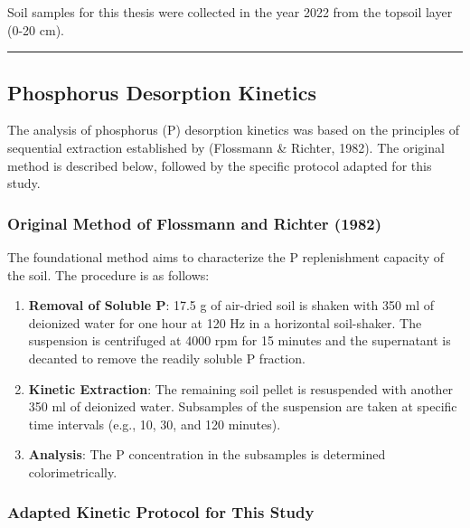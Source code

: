 \documentclass[
  a4paper,
]{article}
\providecommand{\tightlist}{%
  \setlength{\itemsep}{0pt}\setlength{\parskip}{0pt}}
\begin{document}
Soil samples for this thesis were collected in the year 2022 from the
topsoil layer (0-20 cm).

\begin{center}\rule{0.5\linewidth}{0.5pt}\end{center}

\subsection{Phosphorus Desorption
Kinetics}\label{sec-phosphorus-desorption-kinetics}

The analysis of phosphorus (P) desorption kinetics was based on the
principles of sequential extraction established by (Flossmann \&
Richter, 1982). The original method is described below, followed by the
specific protocol adapted for this study.

\subsubsection{Original Method of Flossmann and Richter
(1982)}\label{original-method-of-flossmann-and-richter-1982}

The foundational method aims to characterize the P replenishment
capacity of the soil. The procedure is as follows:

\begin{enumerate}
\def\labelenumi{\arabic{enumi}.}
\tightlist
\item
  \textbf{Removal of Soluble P}: 17.5 g of air-dried soil is shaken with
  350 ml of deionized water for one hour at 120 Hz in a horizontal
  soil-shaker. The suspension is centrifuged at 4000 rpm for 15 minutes
  and the supernatant is decanted to remove the readily soluble P
  fraction.
\item
  \textbf{Kinetic Extraction}: The remaining soil pellet is resuspended
  with another 350 ml of deionized water. Subsamples of the suspension
  are taken at specific time intervals (e.g., 10, 30, and 120 minutes).
\item
  \textbf{Analysis}: The P concentration in the subsamples is determined
  colorimetrically.
\end{enumerate}

\subsubsection{Adapted Kinetic Protocol for This
Study}\label{sec-adapted-kinetic-protocol-for-this-study}
\end{document}
